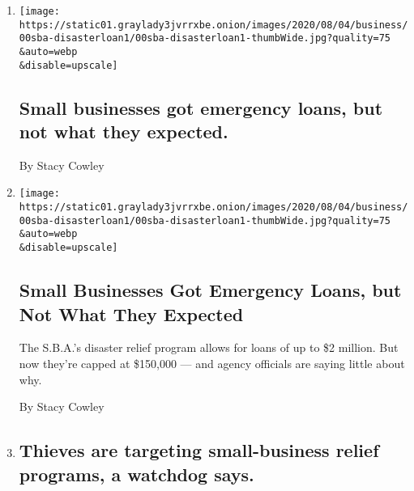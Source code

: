 \begin{enumerate}
\def\labelenumi{\arabic{enumi}.}
\item
  \href{/live/2020/08/03/business/stock-market-today-coronavirus/small-businesses-got-emergency-loans-but-not-what-they-expected}{}

  \texttt{[image: https://static01.graylady3jvrrxbe.onion/images/2020/08/04/business/00sba-disasterloan1/00sba-disasterloan1-thumbWide.jpg?quality=75\\\&auto=webp\\\&disable=upscale]}

  \hypertarget{small-businesses-got-emergency-loans-but-not-what-they-expected}{%
  \subsection{Small businesses got emergency loans, but not what they
  expected.}\label{small-businesses-got-emergency-loans-but-not-what-they-expected}}

  By Stacy Cowley
\item
  \href{/2020/08/03/business/small-business-loans-coronavirus.html}{}

  \texttt{[image: https://static01.graylady3jvrrxbe.onion/images/2020/08/04/business/00sba-disasterloan1/00sba-disasterloan1-thumbWide.jpg?quality=75\\\&auto=webp\\\&disable=upscale]}

  \hypertarget{small-businesses-got-emergency-loans-but-not-what-they-expected-1}{%
  \subsection{Small Businesses Got Emergency Loans, but Not What They
  Expected}\label{small-businesses-got-emergency-loans-but-not-what-they-expected-1}}

  The S.B.A.'s disaster relief program allows for loans of up to \$2
  million. But now they're capped at \$150,000 --- and agency officials
  are saying little about why.

  By Stacy Cowley
\item
  \href{/live/2020/07/28/business/stock-market-today-coronavirus/thieves-are-targeting-small-business-relief-programs-a-watchdog-says}{}

  \hypertarget{thieves-are-targeting-small-business-relief-programs-a-watchdog-says}{%
  \subsection{Thieves are targeting small-business relief programs, a
  watchdog
  says.}\label{thieves-are-targeting-small-business-relief-programs-a-watchdog-says}}


\end{enumerate}
